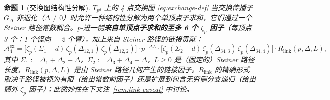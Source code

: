 \documentclass[11pt,a4paper]{ctexart}
\newtheorem{proposition}[theorem]{命题}
\theoremstyle{remark}
\begin{document}
\begin{proposition}[交换图结构性分解]
\label{prop:exchange}
$T_{p^d}$ 上的 4 点交换图 \eqref{eq:exchange-def} 当交换传播子 $G_\Delta$ 非退化（$\Delta \neq 0$）时允许一种结构性分解为两个单顶点子求和，它们通过一个 Steiner 路径常数耦合。p-进一侧\textbf{来自单顶点子求和的至多 6 个 $\zeta_p$ 因子}（每顶点 3 个：1 个径向 $+$ 2 个臂），加上来自 Steiner 路径的\emph{链接贡献}：
\begin{equation}
\label{eq:exchange-factors}
\mathcal{A}^{\mathrm{ex}}_4 = \Big[\zeta_p(\Sigma_1{-}d)\,\zeta_p(\Delta_{12,1})\,\zeta_p(\Delta_{12,2})\Big] \cdot p^{-\Delta L} \cdot \Big[\zeta_p(\Sigma_2{-}d)\,\zeta_p(\Delta_{34,3})\,\zeta_p(\Delta_{34,4})\Big] \cdot R_{\mathrm{link}}(p, \Delta, L),
\end{equation}
其中 $\Sigma_1 := \Delta_1 + \Delta_2 + \Delta$，$\Sigma_2 := \Delta_3 + \Delta_4 + \Delta$，$L \geq 0$ 是（固定的）Steiner 路径长度，$R_{\mathrm{link}}(p, \Delta, L)$ 是由 Steiner 路径几何产生的\emph{链接因子}。$R_{\mathrm{link}}$ 的精确形式取决于路径被视为有限（给出常数前因子）还是扩展到包含无穷侧分支递归（给出额外 $\zeta_p$ 因子）；此微妙性在下文注~\ref{rem:link-caveat} 中讨论。
\end{proposition}
\end{document}
